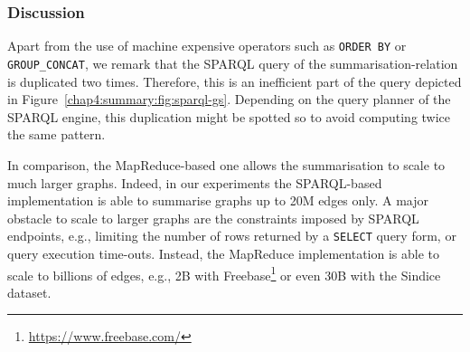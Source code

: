 \subsubsection{Discussion}

Apart from the use of machine expensive operators such as \texttt{ORDER BY} or \texttt{GROUP\_CONCAT}, we remark that the SPARQL query of the \gls{summarisation-relation} is duplicated two times. Therefore, this is an inefficient part of the query depicted in Figure~\ref{chap4:summary:fig:sparql-gs}. Depending on the query planner of the SPARQL engine, this duplication might be spotted so to avoid computing twice the same pattern.

In comparison, the MapReduce-based one allows the summarisation to scale to much larger graphs. Indeed, in our experiments the SPARQL-based implementation is able to summarise graphs up to 20M edges only. A major obstacle to scale to larger graphs are the constraints imposed by SPARQL endpoints, e.g., limiting the number of rows returned by a \texttt{SELECT} query form, or query execution time-outs. Instead, the MapReduce implementation is able to scale to billions of edges, e.g., 2B with Freebase\footnote{\url{https://www.freebase.com/}} or even 30B with the Sindice dataset.

